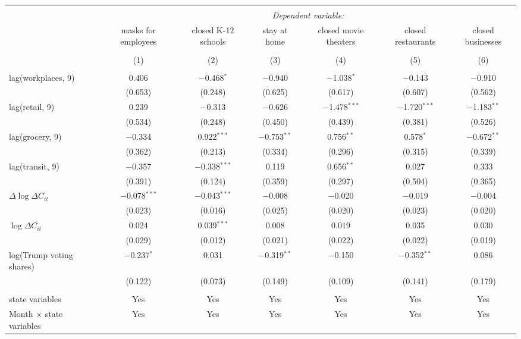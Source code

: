 \begin{tabular}{@{\extracolsep{1pt}}lcccccc} 
\\[-1.8ex]\hline 
\hline \\[-1.8ex] 
 & \multicolumn{6}{c}{\textit{Dependent variable:}} \\ 
\cline{2-7} 
 & masks for employees & closed K-12 schools & stay at home & closed movie theaters & closed restaurants & closed businesses \\ 
\\[-1.8ex] & (1) & (2) & (3) & (4) & (5) & (6)\\ 
\hline \\[-1.8ex] 
 lag(workplaces, 9) & 0.406 & $-$0.468$^{*}$ & $-$0.940 & $-$1.038$^{*}$ & $-$0.143 & $-$0.910 \\ 
  & (0.653) & (0.248) & (0.625) & (0.617) & (0.607) & (0.562) \\ 
  lag(retail, 9) & 0.239 & $-$0.313 & $-$0.626 & $-$1.478$^{***}$ & $-$1.720$^{***}$ & $-$1.183$^{**}$ \\ 
  & (0.534) & (0.248) & (0.450) & (0.439) & (0.381) & (0.526) \\ 
  lag(grocery, 9) & $-$0.334 & 0.922$^{***}$ & $-$0.753$^{**}$ & 0.756$^{**}$ & 0.578$^{*}$ & $-$0.672$^{**}$ \\ 
  & (0.362) & (0.213) & (0.334) & (0.296) & (0.315) & (0.339) \\ 
  lag(transit, 9) & $-$0.357 & $-$0.338$^{***}$ & 0.119 & 0.656$^{**}$ & 0.027 & 0.333 \\ 
  & (0.391) & (0.124) & (0.359) & (0.297) & (0.504) & (0.365) \\ 
  $\Delta \log \Delta C_{it}$ & $-$0.078$^{***}$ & $-$0.043$^{***}$ & $-$0.008 & $-$0.020 & $-$0.019 & $-$0.004 \\ 
  & (0.023) & (0.016) & (0.025) & (0.020) & (0.023) & (0.020) \\ 
  $\log \Delta C_{it}$ & 0.024 & 0.039$^{***}$ & 0.008 & 0.019 & 0.035 & 0.030 \\ 
  & (0.029) & (0.012) & (0.021) & (0.022) & (0.022) & (0.019) \\ 
  log(Trump voting shares) & $-$0.237$^{*}$ & 0.031 & $-$0.319$^{**}$ & $-$0.150 & $-$0.352$^{**}$ & 0.086 \\ 
  & (0.122) & (0.073) & (0.149) & (0.109) & (0.141) & (0.179) \\ 
 \hline \\[-1.8ex] 
state variables & Yes & Yes & Yes & Yes & Yes & Yes \\ 
Month $\times$ state variables & Yes & Yes & Yes & Yes & Yes & Yes \\ 

\end{tabular}
